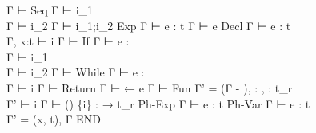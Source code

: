 {{              { }
              {Γ ⊢ \iPass}
          }
    {Seq}{ 
             { Γ ⊢ i_1 \\
               Γ ⊢ i_2
             }{
               Γ ⊢ i_1;i_2
             }
         }
    {Exp}{ 
             { Γ ⊢ e : t }
             { Γ ⊢ e }
         }
    {Decl}{ 
              { Γ ⊢ e : t
             \\ Γ, x:t ⊢ i
              }
              { Γ ⊢  }
          }
    {If}{ 
            { Γ ⊢ e : \tInt \\
              Γ ⊢ i_1 \\
              Γ ⊢ i_2
            }
            { Γ ⊢  }
        }
    {While}{ 
               { Γ ⊢ e : \tInt \\
                 Γ ⊢ i
               }
               { Γ ⊢  }
           }
    {Return}{ 
                { Γ ⊢ \vRet ← e }
                { Γ ⊢  }
            }
    {Fun}{ 
             { Γ' = (Γ - \vRet),
                     : ,
                     \vRet : t_r \\
               Γ' ⊢ i
             }
             { Γ ⊢  () \{i\}
                    :  → t_r
             }
         }
    {Ph-Exp}{ 
                { Γ ⊢ e : t }
                {  }
            }
    {Ph-Var}{ 
                { Γ ⊢ e : t \\
                  Γ' = (x, t), Γ
                }
                {  }
            }
    {END}
}

